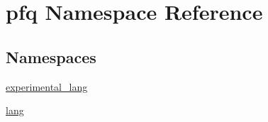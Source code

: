 \hypertarget{namespacepfq}{\section{pfq Namespace Reference}
\label{namespacepfq}
}
\subsection*{Namespaces}
\begin{DoxyCompactItemize}
\item 
 \hyperlink{namespacepfq_1_1experimental__lang}{experimental\+\_\+lang}
\item 
 \hyperlink{namespacepfq_1_1lang}{lang}
\end{DoxyCompactItemize}
